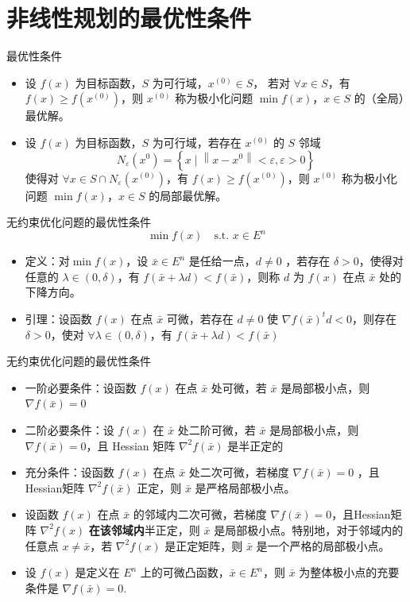 \section{非线性规划的最优性条件}
\begin{remark}
    最优性条件 
    \begin{itemize}
        \item 设 $f(x)$ 为目标函数，$S$ 为可行域，$x^{(0)} \in S$， 若对 $\forall x \in S$，有 $f(x) \ge f(x^{(0)})$，则 $x^{(0)}$ 称为极小化问题 $\min f(x)$，$x \in S$ 的（全局）最优解。
        \item 设 $f(x)$ 为目标函数，$S$ 为可行域，若存在 $x^{(0)}$ 的 $S$ 邻域 \[N_{\varepsilon}\left(x^{0}\right)=\left\{x \mid\left\|x-x^{0}\right\|<\varepsilon, \varepsilon>0\right\}\]使得对 $\forall x \in S \cap N_\varepsilon(x^{(0)})$，有 $f(x) \ge f(x^{(0)})$，则 $x^{(0)}$ 称为极小化问题 $\min f(x)$，$x \in S$ 的局部最优解。
    \end{itemize}
\end{remark}

\begin{remark}
    无约束优化问题的最优性条件\[\min f(x) \quad \text{s.t. } x \in E^n\]
    \begin{itemize}
        \item 定义：对$\min f(x)$，设 $\bar{x} \in E^n$ 是任给一点，$d\neq 0$ ，若存在 $\delta > 0$，使得对任意的 $\lambda \in (0, \delta)$，有 $f(\bar{x} + \lambda d) < f(\bar{x})$，则称 $d$ 为 $f(x)$ 在点 $\bar{x}$ 处的下降方向。
        \item 引理：设函数 $f(x)$ 在点 $\bar{x}$ 可微，若存在 $d \neq 0$ 使 $\nabla f(\bar{x})^td < 0$，则存在 $\delta > 0$，使对 $\forall \lambda\in (0, \delta)$，有 $f(\bar{x} + \lambda d) < f(\bar{x})$
    \end{itemize}
\end{remark}

\begin{remark}
    无约束优化问题的最优性条件\begin{itemize}
        \item 一阶必要条件：设函数 $f(x)$ 在点 $\bar{x}$ 处可微，若 $\bar{x}$ 是局部极小点，则 $\nabla f(\bar{x}) = 0$
        \item 二阶必要条件：设 $f(x)$ 在 $\bar{x}$ 处二阶可微，若 $\bar{x}$ 是局部极小点，则 $\nabla f(\bar{x}) = 0$，且 Hessian 矩阵 $\nabla^2f(\bar{x})$ 是半正定的
        \item 充分条件：设函数 $f(x)$ 在点 $\bar{x}$ 处二次可微，若梯度 $\nabla f(\bar{x}) = 0$ ，且 Hessian矩阵 $\nabla^2f(\bar{x})$ 正定，则 $\bar{x}$ 是严格局部极小点。
        \item 设函数 $f(x)$ 在点 $\bar{x}$ 的邻域内二次可微，若梯度 $\nabla f(\bar{x}) = 0$，且Hessian矩阵 $\nabla^2f(x)$ \textbf{在该邻域内}半正定，则 $\bar{x}$ 是局部极小点。特别地，对于邻域内的任意点 $x\neq \bar{x}$，若 $\nabla^2f(x)$ 是正定矩阵，则 $\bar{x}$ 是一个严格的局部极小点。
        \item 设 $f(x)$ 是定义在 $E^n$ 上的可微凸函数，$\bar{x} \in E^n$，则 $\bar{x}$ 为整体极小点的充要条件是 $\nabla f(\bar{x}) = 0$.
    \end{itemize}
\end{remark}

